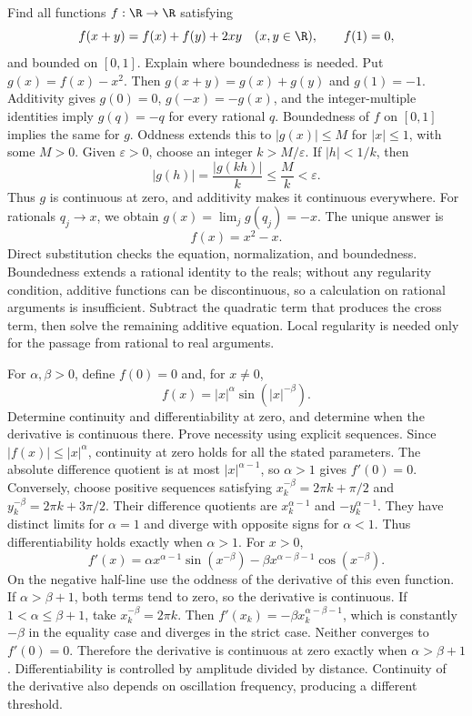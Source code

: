 Find all functions $f:\R\to\R$ satisfying
\[
 f(x+y)=f(x)+f(y)+2xy\quad(x,y\in\R),
 \qquad f(1)=0,
\]
and bounded on $[0,1]$. Explain where boundedness is needed.
\solution Put $g(x)=f(x)-x^2$. Then $g(x+y)=g(x)+g(y)$ and $g(1)=-1$. Additivity gives $g(0)=0$, $g(-x)=-g(x)$, and the integer-multiple identities imply $g(q)=-q$ for every rational $q$.
Boundedness of $f$ on $[0,1]$ implies the same for $g$. Oddness extends this to $|g(x)|\le M$ for $|x|\le1$, with some $M>0$. Given $\varepsilon>0$, choose an integer $k>M/\varepsilon$. If $|h|<1/k$, then
\[
 |g(h)|=\frac{|g(kh)|}{k}\le\frac Mk<\varepsilon.
\]
Thus $g$ is continuous at zero, and additivity makes it continuous everywhere. For rationals $q_j\to x$, we obtain $g(x)=\lim_jg(q_j)=-x$. The unique answer is
\[
 \boxed{f(x)=x^2-x}.
\]
Direct substitution checks the equation, normalization, and boundedness. Boundedness extends a rational identity to the reals; without any regularity condition, additive functions can be discontinuous, so a calculation on rational arguments is insufficient.
\insight Subtract the quadratic term that produces the cross term, then solve the remaining additive equation. Local regularity is needed only for the passage from rational to real arguments.

For $\alpha,\beta>0$, define $f(0)=0$ and, for $x\ne0$,
\[
 f(x)=|x|^\alpha\sin(|x|^{-\beta}).
\]
Determine continuity and differentiability at zero, and determine when the derivative is continuous there. Prove necessity using explicit sequences.
\solution Since $|f(x)|\le|x|^\alpha$, continuity at zero holds for all the stated parameters. The absolute difference quotient is at most $|x|^{\alpha-1}$, so $\alpha>1$ gives $f'(0)=0$.
Conversely, choose positive sequences satisfying $x_k^{-\beta}=2\pi k+\pi/2$ and $y_k^{-\beta}=2\pi k+3\pi/2$. Their difference quotients are $x_k^{\alpha-1}$ and $-y_k^{\alpha-1}$. They have distinct limits for $\alpha=1$ and diverge with opposite signs for $\alpha<1$. Thus differentiability holds exactly when $\alpha>1$.
For $x>0$,
\[
 f'(x)=\alpha x^{\alpha-1}\sin(x^{-\beta})
 -\beta x^{\alpha-\beta-1}\cos(x^{-\beta}).
\]
On the negative half-line use the oddness of the derivative of this even function. If $\alpha>\beta+1$, both terms tend to zero, so the derivative is continuous. If $1<\alpha\le\beta+1$, take $x_k^{-\beta}=2\pi k$. Then $f'(x_k)=-\beta x_k^{\alpha-\beta-1}$, which is constantly $-\beta$ in the equality case and diverges in the strict case. Neither converges to $f'(0)=0$. Therefore the derivative is continuous at zero exactly when $\alpha>\beta+1$.
\insight Differentiability is controlled by amplitude divided by distance. Continuity of the derivative also depends on oscillation frequency, producing a different threshold.

